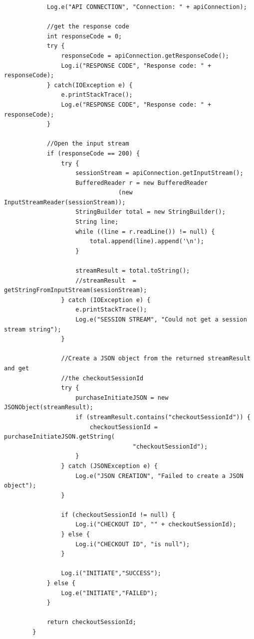 \documentclass[journal,compsoc, 10pt, draftclsnofoot, onecolumn]{IEEEtran}
\begin{document}
\begin{lstlisting}
            Log.e("API CONNECTION", "Connection: " + apiConnection);

            //get the response code
            int responseCode = 0;
            try {
                responseCode = apiConnection.getResponseCode();
                Log.i("RESPONSE CODE", "Response code: " + responseCode);
            } catch(IOException e) {
                e.printStackTrace();
                Log.e("RESPONSE CODE", "Response code: " + responseCode);
            }

            //Open the input stream
            if (responseCode == 200) {
                try {
                    sessionStream = apiConnection.getInputStream();
                    BufferedReader r = new BufferedReader
                    			(new InputStreamReader(sessionStream));
                    StringBuilder total = new StringBuilder();
                    String line;
                    while ((line = r.readLine()) != null) {
                        total.append(line).append('\n');
                    }

                    streamResult = total.toString();
                    //streamResult  = getStringFromInputStream(sessionStream);
                } catch (IOException e) {
                    e.printStackTrace();
                    Log.e("SESSION STREAM", "Could not get a session stream string");
                }

                //Create a JSON object from the returned streamResult and get
                //the checkoutSessionId
                try {
                    purchaseInitiateJSON = new JSONObject(streamResult);
                    if (streamResult.contains("checkoutSessionId")) {
                        checkoutSessionId = purchaseInitiateJSON.getString(
                        			"checkoutSessionId");
                    }
                } catch (JSONException e) {
                    Log.e("JSON CREATION", "Failed to create a JSON object");
                }

                if (checkoutSessionId != null) {
                    Log.i("CHECKOUT ID", "" + checkoutSessionId);
                } else {
                    Log.i("CHECKOUT ID", "is null");
                }

                Log.i("INITIATE","SUCCESS");
            } else {
                Log.e("INITIATE","FAILED");
            }

            return checkoutSessionId;
        }
\end{lstlisting}
\end{document}
